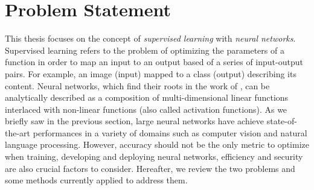 \section{Problem Statement}
\label{section:ch1-problem_setting}

This thesis focuses on the concept of \emph{supervised learning} with \emph{neural networks}. 
Supervised learning refers to the problem of optimizing the parameters of a function in order to map an input to an output based of a series of input-output pairs.
For example, an image (input) mapped to a class (output) describing its content.
Neural networks, which find their roots in the work of \citet{mcculloch1943logical,rosenblatt1958perceptron}, can be analytically described as a composition of multi-dimensional linear functions interlaced with non-linear functions (also called activation functions).
As we briefly saw in the previous section, large neural networks have achieve state-of-the-art performances in a variety of domains such as computer vision and natural language processing.
However, accuracy should not be the only metric to optimize when training, developing and deploying neural networks, efficiency and security are also crucial factors to consider.
Hereafter, we review the two problems and some methods currently applied to address them. 





